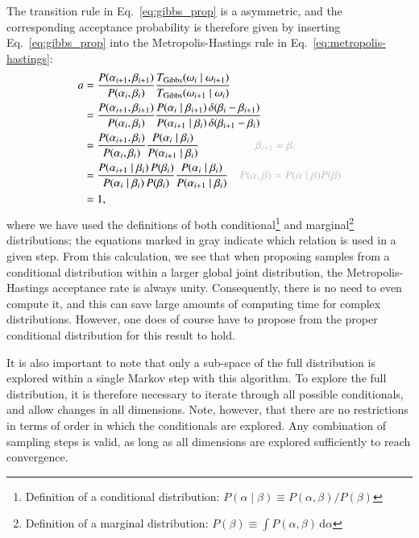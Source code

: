 \documentclass[twocolumn]{aa}
\begin{document}
The transition rule in Eq.~\eqref{eq:gibbs_prop} is a asymmetric, and the corresponding
acceptance probability is therefore given by inserting
Eq.~\eqref{eq:gibbs_prop} into the Metropolis-Hastings rule in
Eq.~\eqref{eq:metropolis-hastings}:
\begin{align}
  a &= \frac{P(\alpha_{i+1}, \beta_{i+1})}{P(\alpha_{i}, \beta_{i})}
  \frac{T_{\mathrm{Gibbs}}(\omega_{i}\mid
    \omega_{i+1})}{T_{\mathrm{Gibbs}}(\omega_{i+1}\mid \omega_i)}\\
  &= 
  \frac{P(\alpha_{i+1}, \beta_{i+1})}{P(\alpha_{i}, \beta_{i})}
  \frac{P(\alpha_{i}\mid
    \beta_{i+1})\,\delta(\beta_{i}-\beta_{i+1})}{P(\alpha_{i+1}\mid \beta_{i})\,\delta(\beta_{i+1}-\beta_i)}\\
  &= 
  \frac{P(\alpha_{i+1}, \beta_{i})}{P(\alpha_{i}, \beta_{i})}
  \frac{P(\alpha_{i}\mid \beta_{i})}{P(\alpha_{i+1}\mid \beta_{i})}\quad \quad\quad\quad\quad{\color{gray}\beta_{i+1}=\beta_i} \\
  &= 
  \frac{P(\alpha_{i+1}\mid \beta_i)\,P(\beta_{i})}{P(\alpha_{i}\mid \beta_{i})\,P(\beta_i)}
  \frac{P(\alpha_{i}\mid \beta_{i})}{P(\alpha_{i+1}\mid \beta_{i})}\quad {\color{gray} P(\alpha,\beta) = P(\alpha\mid\beta)P(\beta)}\\
  &= 1,
\end{align}
where we have used the definitions of both
conditional\footnote{Definition of a conditional distribution: $P(\alpha\mid \beta) \equiv P(\alpha,\beta)/P(\beta)$}
and marginal\footnote{Definition of a marginal distribution: $P(\beta) \equiv \int P(\alpha, \beta)\,\mathrm
  d\alpha$} distributions; the equations marked in gray indicate which
relation is used in a given step. From this calculation, we see that
when proposing samples from a conditional distribution within a larger
global joint distribution, the Metropolis-Hastings acceptance rate is
always unity. Consequently, there is no need to even compute it, and
this can save large amounts of computing time for complex
distributions. However, one does of course have to propose from the
proper conditional distribution for this result to hold.

It is also important to note that only a sub-space of the full
distribution is explored within a single Markov step with this
algorithm. To explore the full distribution, it is therefore necessary
to iterate through all possible conditionals, and allow changes in all
dimensions. Note, however, that there are no restrictions in terms of
order in which the conditionals are explored. Any combination of
sampling steps is valid, as long as all dimensions are explored
sufficiently to reach convergence.
\end{document}
